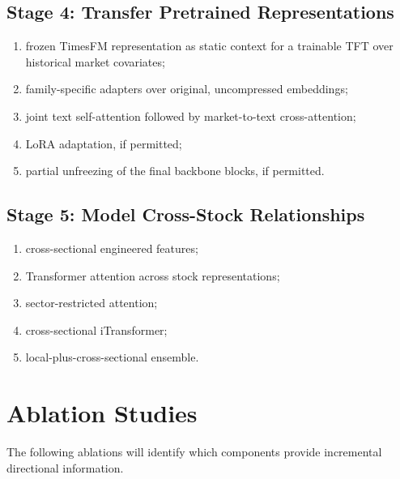 \documentclass[11pt]{article}
\begin{document}
\subsection{Stage 4: Transfer Pretrained Representations}

\begin{enumerate}
    \item frozen TimesFM representation as static context for a trainable TFT
    over historical market covariates;
    \item family-specific adapters over original, uncompressed embeddings;
    \item joint text self-attention followed by market-to-text
    cross-attention;
    \item LoRA adaptation, if permitted;
    \item partial unfreezing of the final backbone blocks, if permitted.
\end{enumerate}

\subsection{Stage 5: Model Cross-Stock Relationships}

\begin{enumerate}
    \item cross-sectional engineered features;
    \item Transformer attention across stock representations;
    \item sector-restricted attention;
    \item cross-sectional iTransformer;
    \item local-plus-cross-sectional ensemble.
\end{enumerate}

\section{Ablation Studies}

The following ablations will identify which components provide incremental
directional information.
\end{document}
